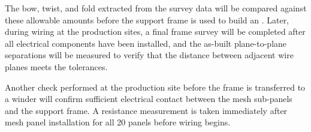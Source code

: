 The bow, twist, and fold extracted from the survey data will be compared against these allowable amounts before the support frame is used to build an .  Later, during  wiring at the production sites, a final frame survey will be completed after all electrical components have been installed, and the as-built plane-to-plane separations will be measured to verify that the distance between adjacent wire planes meets the tolerances.  

Another check performed at the  production site before the frame is transferred to a winder will confirm sufficient electrical contact between the mesh sub-panels and the  support frame.  A resistance measurement is taken immediately after mesh panel installation for all \num{20} panels before wiring begins.








